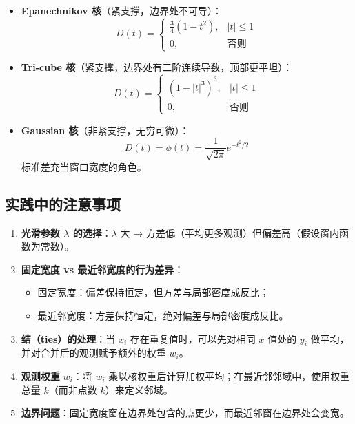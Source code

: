 \begin{itemize}
    \item \textbf{Epanechnikov 核}（紧支撑，边界处不可导）：
    \begin{equation}
        D(t) = \begin{cases}
            \frac{3}{4}(1 - t^2), & |t| \le 1 \\
            0, & \text{否则}
        \end{cases}
    \end{equation}

    \item \textbf{Tri-cube 核}（紧支撑，边界处有二阶连续导数，顶部更平坦）：
    \begin{equation}
        D(t) = \begin{cases}
            (1 - |t|^3)^3, & |t| \le 1 \\
            0, & \text{否则}
        \end{cases}
    \end{equation}

    \item \textbf{Gaussian 核}（非紧支撑，无穷可微）：
    \begin{equation}
        D(t) = \phi(t) = \frac{1}{\sqrt{2\pi}} e^{-t^2/2}
    \end{equation}
    标准差充当窗口宽度的角色。
\end{itemize}

\subsection{实践中的注意事项}

\begin{enumerate}
    \item \textbf{光滑参数 $\lambda$ 的选择}：$\lambda$ 大 → 方差低（平均更多观测）但偏差高（假设窗内函数为常数）。
    \item \textbf{固定宽度 vs 最近邻宽度的行为差异}：
    \begin{itemize}
        \item 固定宽度：偏差保持恒定，但方差与局部密度成反比；
        \item 最近邻宽度：方差保持恒定，绝对偏差与局部密度成反比。
    \end{itemize}
    \item \textbf{结（ties）的处理}：当 $x_i$ 存在重复值时，可以先对相同 $x$ 值处的 $y_i$ 做平均，并对合并后的观测赋予额外的权重 $w_i$。
    \item \textbf{观测权重} $w_i$：将 $w_i$ 乘以核权重后计算加权平均；在最近邻邻域中，使用权重总量 $k$（而非点数 $k$）来定义邻域。
    \item \textbf{边界问题}：固定宽度窗在边界处包含的点更少，而最近邻窗在边界处会变宽。
\end{enumerate}

